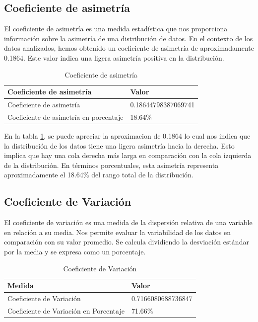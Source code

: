 \subsection{Coeficiente de asimetría}

El coeficiente de asimetría es una medida estadística que nos proporciona
información sobre la asimetría de una distribución de datos. En el contexto de
los datos analizados, hemos obtenido un coeficiente de asimetría de
aproximadamente 0.1864. Este valor indica una ligera asimetría positiva en la
distribución.

\begin{table}[htbp]
    \centering
    \caption{Coeficiente de asimetría}
    \begin{tabular}{ll}
        \hline
        \textbf{Coeficiente de asimetría}      & \textbf{Valor}      \\
        \hline
        Coeficiente de asimetría               & 0.18644798387069741 \\
        Coeficiente de asimetría en porcentaje & 18.64\%             \\
        \hline
    \end{tabular}%
    \label{tab:skewness}%
\end{table}%

En la tabla \ref{tab:skewness}, se puede apreciar la aproximacion de 0.1864 lo
cual nos indica que la distribución de los datos tiene una ligera asimetría
hacia la derecha. Esto implica que hay una cola derecha más larga en
comparación con la cola izquierda de la distribución. En términos porcentuales,
esta asimetría representa aproximadamente el 18.64\% del rango total de la
distribución.

\subsection{Coeficiente de Variación}

El coeficiente de variación es una medida de la dispersión relativa de una
variable en relación a su media. Nos permite evaluar la variabilidad de los
datos en comparación con su valor promedio. Se calcula dividiendo la desviación
estándar por la media y se expresa como un porcentaje.

\begin{table}[htbp]
    \centering
    \caption{Coeficiente de Variación}
    \begin{tabular}{ll}
        \hline
        \textbf{Medida}                        & \textbf{Valor}     \\
        \hline
        Coeficiente de Variación               & 0.7166080688736847 \\
        \hline
        Coeficiente de Variación en Porcentaje & 71.66\%            \\
        \hline
    \end{tabular}
    \label{tab:coef_variacion}
\end{table}

